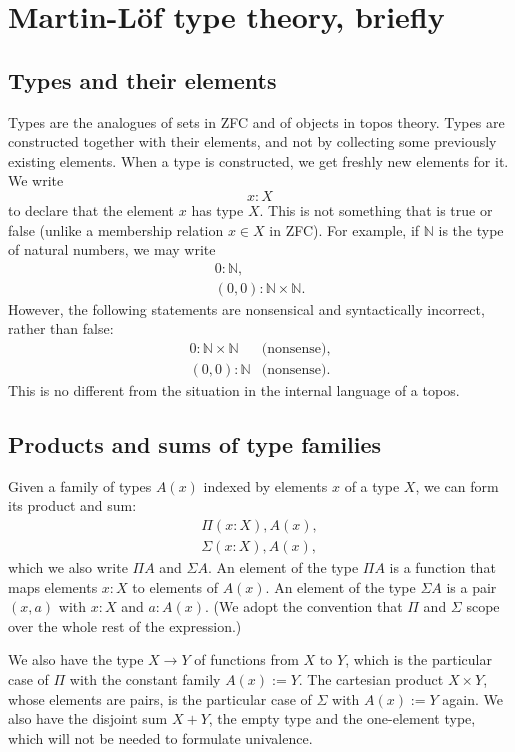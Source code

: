 \documentclass{article}
\newcommand{\N}{\mathbb{N}}
\begin{document}
\section{Martin-L\"of type theory, briefly}

\subsection{Types and their elements}

Types are the analogues of sets in ZFC and of objects in topos theory.
%
Types are constructed together with their elements, and not by
collecting some previously existing elements. When a type is
constructed, we get freshly new elements for it. We write
\[
    x:X
\]
to declare that the element $x$ has type $X$. This is not something
that is true or false (unlike a membership relation $x \in X$ in
ZFC). For example, if $\N$ is the type of natural numbers, we may
write
\begin{gather*}  
    0 : \N, \\
   (0,0) : \N \times  \N.
\end{gather*}
However, the following statements are nonsensical and syntactically
incorrect, rather than false:
\begin{eqnarray*}
    0 : \N \times  \N & \text{(nonsense)}, \\
   (0,0) : \N & \text{(nonsense)}.  
\end{eqnarray*}
This is no different from the situation in the internal language of a
topos.

\subsection{Products and sums of type families}

Given a family of types $A(x)$ indexed by elements $x$ of a type $X$, we can
form its product and sum:
\begin{gather*}
    \Pi(x:X), A(x), \\
    \Sigma(x:X), A(x),  
\end{gather*}
which we also write $\Pi A$ and $\Sigma A$. An element of the type $\Pi A$ is a
function that maps elements $x:X$ to elements of $A(x)$. An element of the
type $\Sigma A$ is a pair $(x,a)$ with $x:X$ and $a:A(x)$.
%
(We adopt the convention that $\Pi$ and $\Sigma$ scope over the whole rest of the
expression.)

We also have the type $X\to Y$ of functions from $X$ to $Y$, which is
the particular case of $\Pi$ with the constant family $A(x):=Y$.  The
cartesian product $X\times Y$, whose elements are pairs, is the
particular case of $\Sigma$ with $A(x):=Y$ again.
We also have the disjoint sum $X+Y$, the empty type and the
one-element type, which will not be needed to formulate univalence.
\end{document}
